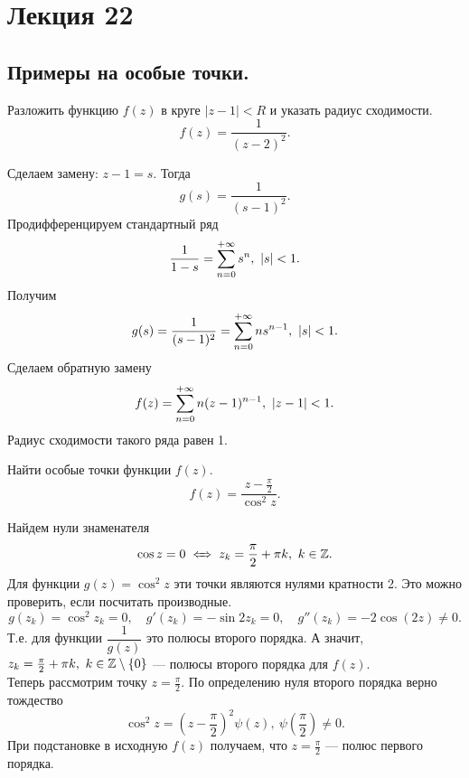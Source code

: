 	\section{Лекция 22}
	\subsection{Примеры на особые точки.}
	\begin{example}
		Разложить функцию $f(z)$ в круге $|z-1| < R$ и указать радиус сходимости.
		\[ f(z) = \frac{1}{(z-2)^2}. \]
	\end{example}
	\noindent Сделаем замену: $z-1 = s$. Тогда
	\[ g(s) = \frac{1}{(s-1)^2}. \]
	Продифференцируем стандартный ряд
	\[ \frac{1}{1-s} = \sum\limits_{n=0}^{+\infty}s^n,\ |s| < 1.\]
	Получим
	\[ g(s) = \frac{1}{(s-1)^2} = \sum\limits_{n=0}^{+\infty}ns^{n-1},\ |s| < 1. \]
	Сделаем обратную замену
	\[ f(z) = \sum\limits_{n=0}^{+\infty}n(z-1)^{n-1},\ |z-1| < 1. \]
	Радиус сходимости такого ряда равен 1.
	\begin{example}
		Найти особые точки функции $f(z)$.
		\[ f(z) = \frac{z-\frac{\pi}{2}}{\cos^2 z}. \]
	\end{example}
	\noindent Найдем нули знаменателя
	\[ \cos z = 0 \iff z_k = \frac{\pi}{2} + \pi k,\ k\in\Z. \]
	Для функции $g(z) = \cos^2z$ эти точки являются нулями кратности 2. Это можно проверить, если посчитать производные.
	\[ g(z_k) = \cos^2z_k = 0,\quad g'(z_k) = -\sin 2z_k = 0, \quad g''(z_k) = -2\cos(2z)\ne0. \]
	Т.е. для функции $\dfrac{1}{g(z)}$ это полюсы второго порядка. А значит, $z_k = \frac{\pi}{2} + \pi k,\ k\in\mathbb{Z}\setminus\{0\}$ --- полюсы второго порядка для $f(z)$.\\
	Теперь рассмотрим точку $z = \frac{\pi}{2}$. По определению нуля второго порядка верно тождество 
	\[ \cos^2z = \left( z-\frac{\pi}{2}\right)^2\psi(z),\ \psi\left( \frac{\pi}{2}\right) \ne 0. \]
	При подстановке в исходную $f(z)$ получаем, что $z=\frac{\pi}{2}$ --- полюс первого порядка.
